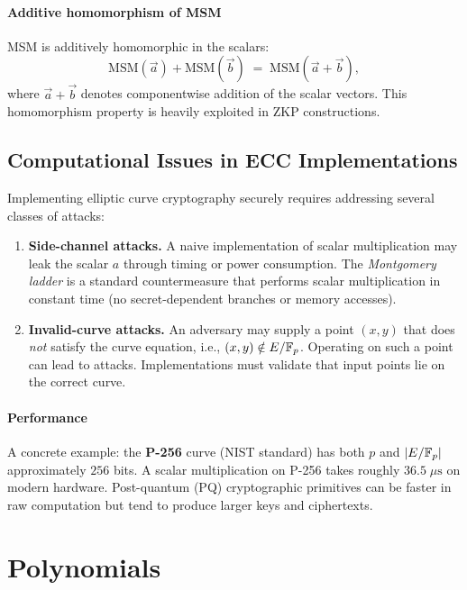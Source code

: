 \documentclass[11pt]{article}
\begin{document}
\paragraph{Additive homomorphism of MSM}
MSM is additively homomorphic in the scalars:
\[
  \mathrm{MSM}(\vec{a}) + \mathrm{MSM}(\vec{b})
  \;=\; \mathrm{MSM}(\vec{a} + \vec{b}),
\]
where $\vec{a} + \vec{b}$ denotes componentwise addition of the scalar
vectors. This homomorphism property is heavily exploited in ZKP constructions.

\subsection{Computational Issues in ECC Implementations}

Implementing elliptic curve cryptography securely requires addressing
several classes of attacks:

\begin{enumerate}
  \item \textbf{Side-channel attacks.}
        A naive implementation of scalar multiplication may leak the scalar
        $a$ through timing or power consumption.
        The \emph{Montgomery ladder} is a standard countermeasure that
        performs scalar multiplication in constant time (no secret-dependent
        branches or memory accesses).

  \item \textbf{Invalid-curve attacks.}
        An adversary may supply a point $(x,y)$ that does \emph{not} satisfy
        the curve equation, i.e., $(x,y) \notin E/\mathbb{F}_p$.
        Operating on such a point can lead to attacks.
        Implementations must validate that input points lie on the correct curve.
\end{enumerate}

\paragraph{Performance}
A concrete example: the \textbf{P-256} curve (NIST standard) has both
$p$ and $|E/\mathbb{F}_p|$ approximately $256$ bits. A scalar multiplication on
P-256 takes roughly $36.5\;\mu\mathrm{s}$ on modern hardware.
Post-quantum (PQ) cryptographic primitives can be faster in raw computation
but tend to produce larger keys and ciphertexts.

\section{Polynomials}
\label{sec:polynomials}
\end{document}
